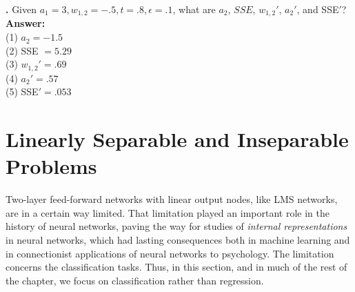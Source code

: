 \noindent
{}
{\bf \theLMSCounter.}  Given $a_1 = 3 ,w_{1,2} = -.5, t = .8 ,\epsilon = .1$, what are $a_2$, $SSE$, $w_{1,2}'$, $a_2'$, and SSE$'$? \\
{\bf Answer:} \\
(1) $a_2 = -1.5$ \\
(2) SSE $= 5.29$ \\
(3) $w_{1,2}' = .69$ \\
(4) $a_2' = .57$ \\
(5) SSE$' = .053$
\bigskip


\section{Linearly Separable and Inseparable Problems}
\label{linearlySeparable}


Two-layer feed-forward networks with linear output nodes, like LMS networks, are in a certain way limited. That limitation played  an important role in the history of neural networks, paving the way for studies of \emph{internal representations} in neural networks, which had lasting consequences both in machine learning and in connectionist applications of neural networks to psychology.  The limitation concerns the  classification tasks. Thus, in this section, and in much of the rest of the chapter, we focus on classification rather than regression.

